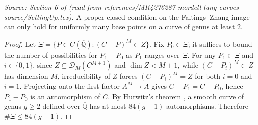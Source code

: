 \begin{lemma}
  \label{lem:packets_alternative3}
  \textit{Source: Section 6 of \cite{MR4276287-mordell-lang-curves} (read from references/MR4276287-mordell-lang-curves-source/SettingUp.tex).}
  A proper closed condition on the Faltings--Zhang image can only hold for
  uniformly many base points on a curve of genus at least \(2\).
\end{lemma}

\begin{proof}
  Let \(\Xi = \{P \in C(\overline{\mathbb{Q}}) : (C-P)^M \subset Z\}\).
  Fix \(P_0 \in \Xi\); it suffices to bound the number of possibilities for \(P_1 - P_0\)
  as \(P_1\) ranges over \(\Xi\).
  For any \(P_1 \in \Xi\) and \(i \in \{0,1\}\), since
  \(Z \subsetneq \mathscr{D}_M(C^{M+1})\) and \(\dim Z < M+1\),
  while \((C-P_i)^M \subset Z\) has dimension \(M\), irreducibility of \(Z\)
  forces \((C - P_i)^M = Z\) for both \(i = 0\) and \(i = 1\).
  Projecting onto the first factor \(A^M \to A\) gives \(C - P_1 = C - P_0\),
  hence \(P_1 - P_0\) is an automorphism of \(C\).
  By Hurwitz's theorem \cite{Hurwitz1892}, a smooth curve of genus \(g \ge 2\)
  defined over \(\overline{\mathbb{Q}}\) has at most \(84(g-1)\) automorphisms.
  Therefore \(\#\Xi \le 84(g-1)\).
\end{proof}

